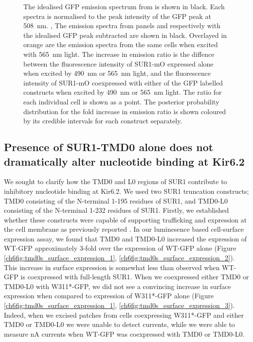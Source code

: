 \begin{figure}[hbtp]
{	The idealised GFP emission spectrum from  is shown in black.
	Each spectra is normalised to the peak intensity of the GFP peak at \SI{508}{\nano\metre}.
	,  The emission spectra from panels  and  respectively with the idealised GFP peak subtracted are shown in black.
	Overlayed in orange are the emission spectra from the same cells when excited with \SI{565}{\nano\metre} light.
	 The increase in emission ratio is the diffence between the fluorescence intensity of SUR1-mO expressed alone when excited by \SI{490}{\nano\metre} or \SI{565}{\nano\metre} light, and the fluorescence intensity of SUR1-mO coexpressed with either of the GFP labelled constructs when excited by \SI{490}{\nano\metre} or \SI{565}{\nano\metre} light.
	The ratio for each individual cell is shown as a point.
	The posterior probability distribution for the fold increase in emission ratio is shown coloured by its credible intervals for each construct separately.
	}\label{ch6fig:sur_assays}
\end{figure}

\subsection{Presence of SUR1-TMD0 alone does not dramatically alter nucleotide binding at Kir6.2}

We sought to clarify how the TMD0 and L0 regions of SUR1 contribute to inhibitory nucleotide binding at Kir6.2.
We used two SUR1 truncation constructs; TMD0 consisting of the N-terminal 1-195 residues of SUR1, and TMD0-L0 consisting of the N-terminal 1-232 residues of SUR1.
Firstly, we established whether these constructs were capable of supporting trafficking and expression at the cell membrane as previously reported \cite{babenko_sur_2003-1, chan_n-terminal_2003-1}.
In our luminesence based cell-surface expression assay, we found that TMD0 and TMD0-L0 increased the expression of WT-GFP approximately 3-fold over the expression of WT-GFP alone (Figure \ref{ch6fig:tmd0s_surface_expression_1}, \ref{ch6fig:tmd0s_surface_expression_2}).
This increase in surface expression is somewhat less than observed when WT-GFP is coexpressed with full-length SUR1.
When we coexpressed either TMD0 or TMD0-L0 with W311*-GFP, we did not see a convincing increase in surface expression when compared to expression of W311*-GFP alone (Figure \ref{ch6fig:tmd0s_surface_expression_1}, \ref{ch6fig:tmd0s_surface_expression_3}).
Indeed, when we excised patches from cells coexpressing W311*-GFP and either TMD0 or TMD0-L0 we were unable to detect currents, while we were able to measure \si{\nano\ampere} currents when WT-GFP was coexpressed with TMD0 or TMD0-L0.

